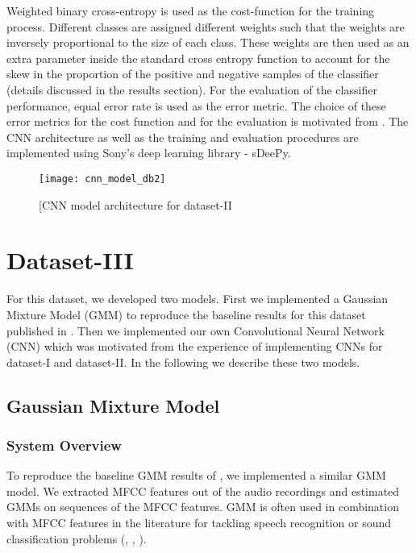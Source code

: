 Weighted binary cross-entropy is used as the cost-function for the training process. Different classes are assigned different weights such that the weights are inversely proportional to the size of each class. These weights are then used as an extra parameter inside the standard cross entropy function to account for the skew in the proportion of the positive and negative samples of the classifier (details discussed in the results section). For the evaluation of the classifier performance, equal error rate is used as the error metric. The choice of these error metrics for the cost function and for the evaluation is motivated from \cite{kons2013audio}. The CNN architecture as well as the training and evaluation procedures are implemented using Sony's deep learning library - sDeePy.

\begin{figure}[!htb] 
\centering 
\texttt{[image: cnn\_model\_db2]}
\caption[CNN model architecture for dataset-II]{[CNN model architecture for dataset-II}
\label{fig:cnn_model_db2} 
\end{figure}


\section{Dataset-III}
For this dataset, we developed two models. First we implemented a Gaussian Mixture Model (GMM) to reproduce the baseline results for this dataset published in \cite{foster2015chime}. Then we implemented our own Convolutional Neural Network (CNN) which was motivated from the experience of implementing CNNs for dataset-I and dataset-II. In the following we describe these two models.

\subsection{Gaussian Mixture Model}

\subsubsection{System Overview}
To reproduce the baseline GMM results of \cite{foster2015chime}, we implemented a similar GMM model. We extracted MFCC features out of the audio recordings and estimated GMMs on sequences of the MFCC features. GMM is often used in combination with MFCC features in the literature for tackling speech recognition or sound classification problems (\cite{stowelldetection}, \cite{defreville2006automatic}, \cite{aucouturier2007bag}).

